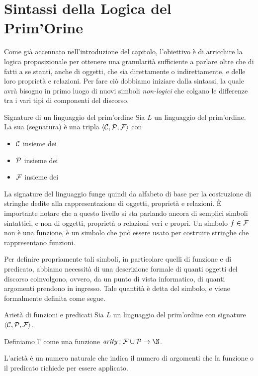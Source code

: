 \section{Sintassi della Logica del Prim'Orine}

Come già accennato nell'introduzione del capitolo, l'obiettivo è di arricchire la logica proposizionale per ottenere una granularità sufficiente a parlare oltre che di fatti a se stanti, anche di oggetti, che sia direttamente o indirettamente, e delle loro proprietà e relazioni. Per fare ciò dobbiamo iniziare dalla sintassi, la quale avrà bisogno in primo luogo di nuovi simboli \textit{non-logici} che colgano le differenze tra i vari tipi di componenti del discorso.

\begin{definition}{Signature di un linguaggio del prim'ordine}
  Sia \(L\) un linguaggio del prim'ordine. La sua  (segnatura) è una tripla \(\langle \mathcal{C}, \mathcal{P}, \mathcal{F} \rangle\) con 
  \begin{itemize}
    \item \(\mathcal{C}\) insieme dei 
    \item \(\mathcal{P}\) insieme dei 
    \item \(\mathcal{F}\) insieme dei 
  \end{itemize}
\end{definition}

La signature del linguaggio funge quindi da alfabeto di base per la costruzione di stringhe dedite alla rappresentazione di oggetti, proprietà e relazioni. È importante notare che a questo livello si sta parlando ancora di semplici simboli sintattici, e non di oggetti, proprietà o relazioni veri e propri. Un simbolo \(f \in \mathcal{F}\) non è una funzione, è un simbolo che può essere usato per costruire stringhe che rappresentano funzioni.

Per definire propriamente tali simboli, in particolare quelli di funzione e di predicato, abbiamo necessità di una descrizione formale di quanti oggetti del discorso coinvolgono, ovvero, da un punto di vista informatico, di quanti argomenti prendono in ingresso. Tale quantità è detta  del simbolo, e viene formalmente definita come segue.

\begin{definition}{Arietà di funzioni e predicati}
  Sia \(L\) un linguaggio del prim'ordine con signature \(\langle \mathcal{C}, \mathcal{P}, \mathcal{F} \rangle\). 
  
  Definiamo l' come una funzione \(\arty: \FuncSyms\cup\PredSyms\to\N\). 
  
  L'arietà è un numero naturale che indica il numero di argomenti che la funzione o il predicato richiede per essere applicato.
\end{definition}

